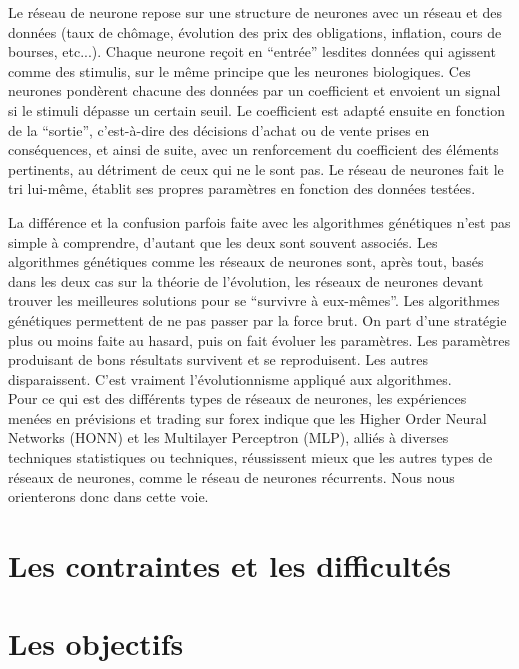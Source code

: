 \documentclass[a4paper,12pt]{article}
\begin{document}
Le réseau de neurone repose sur une structure de neurones avec un réseau et des données (taux de chômage, évolution des prix des obligations, inflation, cours de bourses, etc...). Chaque neurone reçoit en “entrée” lesdites données qui agissent comme des stimulis, sur le même principe que les neurones biologiques. Ces neurones pondèrent chacune des données par un coefficient et envoient un signal si le stimuli dépasse un certain seuil. Le coefficient est adapté ensuite en fonction de la “sortie”, c’est-à-dire des décisions d’achat ou de vente prises en conséquences, et ainsi de suite, avec un renforcement du coefficient des éléments pertinents, au détriment de ceux qui ne le sont pas. Le réseau de neurones fait le tri lui-même, établit ses propres paramètres en fonction des données testées.

La différence et la confusion parfois faite avec les algorithmes génétiques n’est pas simple à comprendre, d’autant que les deux sont souvent associés. Les algorithmes génétiques comme les réseaux de neurones sont, après tout, basés dans les deux cas sur la théorie de l’évolution, les réseaux de neurones devant trouver les meilleures solutions pour se “survivre à eux-mêmes”. Les algorithmes génétiques permettent de ne pas passer par la force brut. On part d’une stratégie plus ou moins faite au hasard, puis on fait évoluer les paramètres. Les paramètres produisant de bons résultats survivent et se reproduisent. Les autres disparaissent. C’est vraiment l’évolutionnisme appliqué aux algorithmes. \\

Pour ce qui est des différents types de réseaux de neurones, les expériences menées en prévisions et trading sur forex indique que les Higher Order Neural Networks (HONN) et les Multilayer Perceptron (MLP), alliés à diverses techniques statistiques ou techniques, réussissent mieux que les autres types de réseaux de neurones, comme le réseau de neurones récurrents. Nous nous orienterons donc dans cette voie.

\section{Les contraintes et les difficultés}


\section{Les objectifs}

\end{document}
